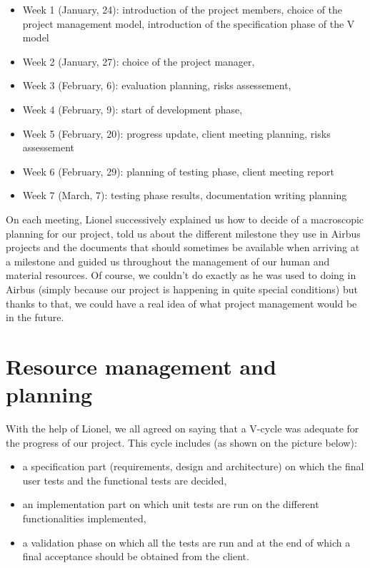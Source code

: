 \documentclass{report}
\begin{document}
\begin{itemize}
\item Week 1 (January, 24): introduction of the project members, choice of the project management model, introduction of the specification phase of the V model
\item Week 2 (January, 27): choice of the project manager, 
\item Week 3 (February, 6): evaluation planning, risks assessement,
\item Week 4 (February, 9): start of development phase, 
\item Week 5 (February, 20): progress update, client meeting planning, risks assessement
\item Week 6 (February, 29): planning of testing phase, client meeting report
\item Week 7 (March, 7): testing phase results, documentation writing planning
\end{itemize}

On each meeting, Lionel successively explained us how to decide of a macroscopic planning for our project, told us about the different milestone they use in Airbus projects and the documents that should sometimes be available when arriving at a milestone and guided us throughout the management of our human and material resources. Of course, we couldn't do exactly as he was used to doing in Airbus (simply because our project is happening in quite special conditions) but thanks to that, we could have a real idea of what project management would be in the future. 

\section{Resource management and planning}

With the help of Lionel, we all agreed on saying that a V-cycle was adequate for the progress of our project. This cycle includes (as shown on the picture below):

\begin{itemize}
\item a specification part (requirements, design and architecture) on which the final user tests and the functional tests are decided,
\item an implementation part on which unit tests are run on the different functionalities implemented,
\item a validation phase on which all the tests are run and at the end of which a final acceptance should be obtained from the client.
\end{itemize}
\end{document}

